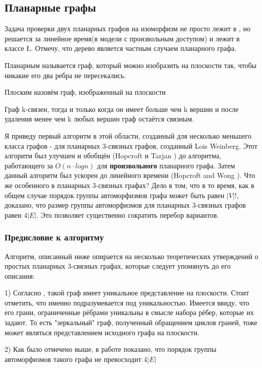 \subsection{Планарные графы}
Задача проверки двух планарных графов на изоморфизм не просто лежит в \poly, но решается за линейное время(в модели с произвольным доступом) \cite{1} и лежит в классе \L\cite{2}. Отмечу, что дерево является частным случаем планарного графа.
\begin{definition}
    Планарным называется граф, который можно изобразить на плоскости так, чтобы никакие его два ребра не пересекались.
\end{definition}
\begin{definition}
    Плоским назовём граф, изображенный на плоскости
\end{definition}
\begin{definition}
    Граф k-связен, тогда и только когда он имеет больше чем k вершин и после удаления менее чем k любых вершин граф остаётся связным. 
\end{definition}
Я приведу первый алгоритм в этой области, созданный для несколько меньшего класса графов - для планарных 3-связных графов\cite{3}, созданный Lois Weinberg. Этот алгоритм был улучшен и обобщён (Hopcroft и Tarjan \cite{6}) до алгоритма, работающего за $O(n \cdot logn)$ для \textbf{произвольного} планарного графа. Затем данный алгоритм был ускорен до линейного времени (Hopcroft and Wong \cite{1}).
Что же особенного в планарных 3-связных графах? Дело в том, что в то время, как в общем случае порядок группы автоморфизмов графа может быть равен $|V|!$, доказано\cite{4}, что размер группы автоморфизмов для планарных 3-связных графов равен $4|E|$. Это позволяет существенно сократить перебор вариантов.
\subsubsection*{Предисловие к алгоритму}
Алгоритм, описанный ниже опирается на несколько теоретических утверждений о простых планарных 3-связных графах, которые следует упомянуть до его описания:

1) Согласно \cite{5}, такой граф имеет уникальное представление на плоскости. Стоит отметить, что именно подразумевается под уникальностью. Имеется ввиду, что его грани, ограниченные рёбрами уникальны в смысле набора рёбер, которые их задают. То есть "зеркальный" граф, полученный обращением циклов граней, тоже может являться представлением исходного графа на плоскости.

2) Как было отмечено выше, в работе \cite{4} показано, что порядок группы автоморфизмов такого графа не превосходит $4|E|$

